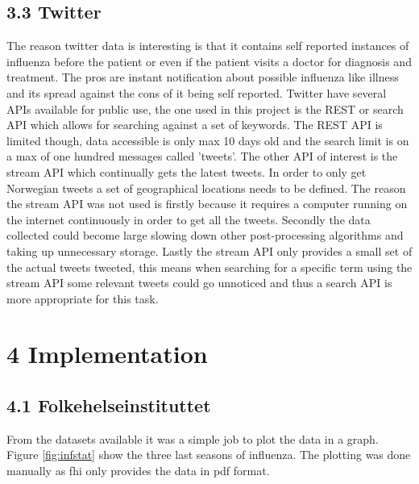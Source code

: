 \documentclass[11pt]{report}
\begin{document}
\section*{3.3 Twitter}
The reason twitter data is interesting is that it contains self reported instances of influenza before the patient or even if the patient visits a doctor for diagnosis and treatment. The pros are instant notification about possible influenza like illness and its spread against the cons of it being self reported. Twitter have several APIs available for public use, the one used in this project is the REST or search API which allows for searching against a set of keywords. The REST API is limited though, data accessible is only max 10 days old and the search limit is on a max of one hundred messages called 'tweets'. The other API of interest is the stream API which continually gets the latest tweets. In order to only get Norwegian tweets a set of geographical locations needs to be defined. The reason the stream API was not used is firstly because it requires a computer running on the internet continuously in order to get all the tweets. Secondly the data collected could become large slowing down other post-processing algorithms and taking up unnecessary storage. Lastly the stream API only provides a small set of the actual tweets tweeted, this means when searching for a specific term using the stream API some relevant tweets could go unnoticed and thus a search API is more appropriate for this task.

\chapter*{\vspace{-3cm}4 Implementation}

\section*{4.1 Folkehelseinstituttet}
From the datasets available it was a simple job to plot the data in a graph. Figure \ref{fig:infstat} show the three last seasons of influenza. The plotting was done manually as fhi only provides the data in pdf format.
\end{document}
